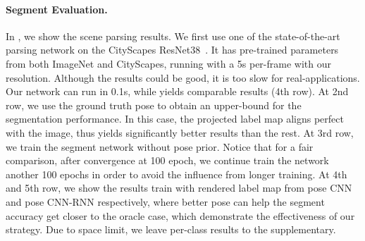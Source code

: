 \paragraph{Segment Evaluation.}
In , we show the scene parsing results. We first use one of the state-of-the-art parsing network on the CityScapes \ie ResNet38~\cite{WuSH16e}. It has pre-trained parameters from both ImageNet and CityScapes, running with a 5s per-frame with our resolution. Although the results could be good, it is too slow for real-applications. Our network can run in 0.1s, while yields comparable results (4th row). At 2nd row, we use the ground truth pose to obtain an upper-bound for the segmentation performance. In this case, the projected label map aligns perfect with the image, thus yields significantly better results than the rest. At 3rd row, we train the segment network without pose prior.  Notice that for a fair comparison, after convergence at 100 epoch, we continue train the network another 100 epochs in order to avoid the influence from longer training.
At 4th and 5th row, we show the results train with rendered label map from pose CNN and pose CNN-RNN respectively, where better pose can help the segment accuracy get closer to the oracle case, which demonstrate the effectiveness of our strategy. Due to space limit, we leave per-class results to the supplementary.


